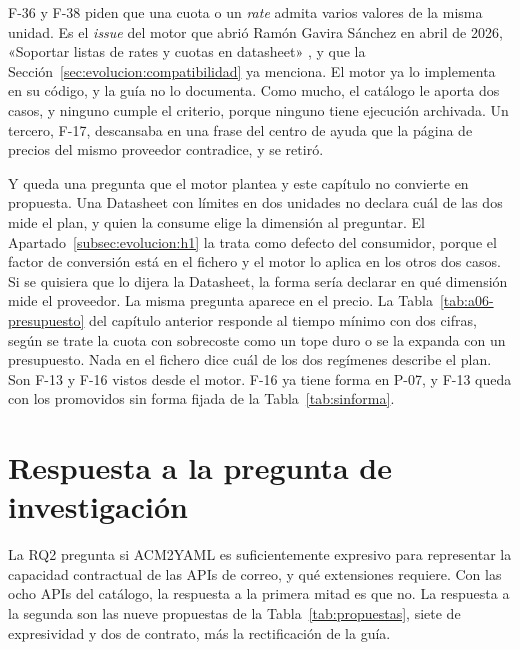F-36 y F-38 piden que una cuota o un \textit{rate} admita varios valores de la misma unidad.
Es el \textit{issue} del motor que abrió Ramón Gavira Sánchez en abril de 2026, «Soportar listas de rates y cuotas en datasheet» \citep{prime4apirepo}, y que la Sección~\ref{sec:evolucion:compatibilidad} ya menciona.
El motor ya lo implementa en su código, y la guía no lo documenta.
Como mucho, el catálogo le aporta dos casos, y ninguno cumple el criterio, porque ninguno tiene ejecución archivada.
Un tercero, F-17, descansaba en una frase del centro de ayuda que la página de precios del mismo proveedor contradice, y se retiró.

Y queda una pregunta que el motor plantea y este capítulo no convierte en
propuesta. Una Datasheet con límites en dos unidades no declara cuál de las dos mide
el plan, y quien la consume elige la dimensión al preguntar. El
Apartado~\ref{subsec:evolucion:h1} la trata como defecto del consumidor, porque el
factor de conversión está en el fichero y el motor lo aplica en los otros dos casos.
Si se quisiera que lo dijera la Datasheet, la forma sería declarar en qué dimensión
mide el proveedor. La misma pregunta aparece en el precio. La
Tabla~\ref{tab:a06-presupuesto} del capítulo anterior responde al tiempo mínimo con
dos cifras, según se trate la cuota con sobrecoste como un tope duro o se la expanda
con un presupuesto. Nada en el fichero dice cuál de los dos regímenes describe el
plan. Son F-13 y F-16 vistos desde el motor.
F-16 ya tiene forma en P-07, y F-13 queda con los promovidos sin forma fijada de la Tabla~\ref{tab:sinforma}.

\section{Respuesta a la pregunta de investigación}
\label{sec:evolucion:respuesta}

La RQ2 pregunta si ACM2YAML es suficientemente expresivo para representar la capacidad contractual de las APIs de correo, y qué extensiones requiere.
Con las ocho APIs del catálogo, la respuesta a la primera mitad es que no.
La respuesta a la segunda son las nueve propuestas de la Tabla~\ref{tab:propuestas}, siete de expresividad y dos de contrato, más la rectificación de la guía.

